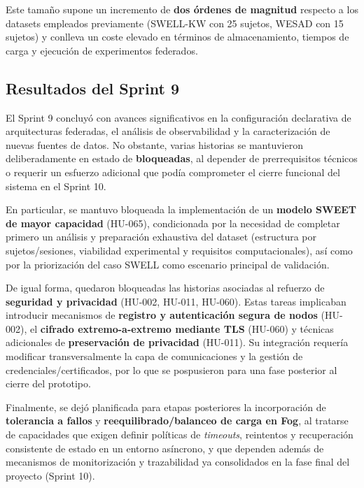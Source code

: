 \documentclass{report}
\begin{document}
Este tamaño supone un incremento de \textbf{dos órdenes de magnitud} respecto a los datasets empleados previamente (SWELL-KW con 25 sujetos, WESAD con 15 sujetos) y conlleva un coste elevado en términos de almacenamiento, tiempos de carga y ejecución de experimentos federados.

\subsection{Resultados del Sprint 9}

El Sprint 9 concluyó con avances significativos en la configuración declarativa de arquitecturas federadas, el análisis de observabilidad y la caracterización de nuevas fuentes de datos. No obstante, varias historias se mantuvieron deliberadamente en estado de \textbf{bloqueadas}, al depender de prerrequisitos técnicos o requerir un esfuerzo adicional que podía comprometer el cierre funcional del sistema en el Sprint 10.

En particular, se mantuvo bloqueada la implementación de un \textbf{modelo SWEET de mayor capacidad} (HU-065), condicionada por la necesidad de completar primero un análisis y preparación exhaustiva del dataset (estructura por sujetos/sesiones, viabilidad experimental y requisitos computacionales), así como por la priorización del caso SWELL como escenario principal de validación.

De igual forma, quedaron bloqueadas las historias asociadas al refuerzo de \textbf{seguridad y privacidad} (HU-002, HU-011, HU-060). Estas tareas implicaban introducir mecanismos de \textbf{registro y autenticación segura de nodos} (HU-002), el \textbf{cifrado extremo-a-extremo mediante TLS} (HU-060) y técnicas adicionales de \textbf{preservación de privacidad} (HU-011). Su integración requería modificar transversalmente la capa de comunicaciones y la gestión de credenciales/certificados, por lo que se pospusieron para una fase posterior al cierre del prototipo.

Finalmente, se dejó planificada para etapas posteriores la incorporación de \textbf{tolerancia a fallos} y \textbf{reequilibrado/balanceo de carga en Fog}, al tratarse de capacidades que exigen definir políticas de \textit{timeouts}, reintentos y recuperación consistente de estado en un entorno asíncrono, y que dependen además de mecanismos de monitorización y trazabilidad ya consolidados en la fase final del proyecto (Sprint 10).
\end{document}
